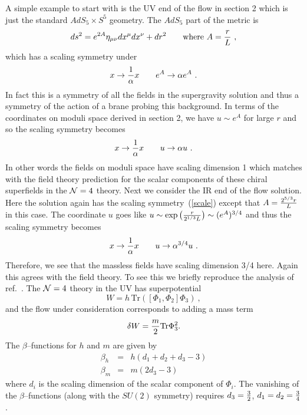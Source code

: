 \documentclass[a4paper,12pt]{article}
\newcommand{\labell}[1]{\label{#1}}
\begin{document}
A simple example to start with is the UV end of the flow in section 2
which is just the standard $AdS_5 \times S^5$ geometry. The $AdS_5$
part of the metric is
\begin{equation}
  ds^2 = e^{2A} \eta_{\mu \nu} dx^\mu dx^\nu + dr^2 \qquad \mbox{where  } A = {r \over L}\ ,
\end{equation}
which has a scaling symmetry under 
\begin{equation}
  x \rightarrow {1 \over \alpha} x \qquad e^{A} \rightarrow \alpha e^{A}\ .
  \labell{scale}
\end{equation}
In fact this is a symmetry of all the fields in the supergravity
solution and thus a symmetry of the action of a brane probing this
background.  In terms of the coordinates on moduli space derived in
section 2, we have $u \sim e^A$ for large $r$ and so the scaling
symmetry becomes
\begin{equation}
 x \rightarrow {1 \over \alpha} x \qquad u \rightarrow \alpha u\  .
\end{equation}
In other words the fields on moduli space have scaling dimension 1
which matches with the field theory prediction for the scalar
components of these chiral superfields in the ${\cal N}=4$ theory.
Next we consider the IR end of the flow solution. Here the solution
again has the scaling symmetry~(\ref{scale}) except that $A = {2^{5/3}
  r \over L}$ in this case. The coordinate $u$ goes like $u \sim \exp
\left( {r \over 2^{1/3} L} \right) \sim (e^A)^{3/4}$ and thus the
scaling symmetry becomes
\begin{equation}
 x \rightarrow {1 \over \alpha} x \qquad u \rightarrow \alpha^{3/4} u\ .
\end{equation}
Therefore, we see that the massless fields have scaling dimension 3/4
here.  Again this agrees with the field theory. To see this we briefly
reproduce the analysis of ref.~\cite{robmatt, freed1,lsflow}.  The ${\cal
  N}=4$ theory in the UV has superpotential
\begin{equation}
  W = h\, \mbox{Tr} ([\Phi_1 , \Phi_2] \Phi_3)\ ,
\end{equation}
and the flow under consideration corresponds to adding a mass term
\begin{equation}
  \delta W = {m \over 2} \mbox{Tr} \Phi_3 ^2 .
\end{equation}
The $\beta$--functions for $h$ and $m$ are given by
\begin{eqnarray}
  \beta_h &=& h (d_1 + d_2 + d_3 - 3) \nonumber\\
  \beta_{m} &=& m (2 d_3 - 3)
\end{eqnarray}
where $d_i$ is the scaling dimension of the scalar component of
$\Phi_i$.  The vanishing of the $\beta$--functions (along with the $SU(2)$
symmetry) requires $d_3 = {3 \over 2}$, $d_1 = d_2 = {3 \over 4}$.
\end{document}
